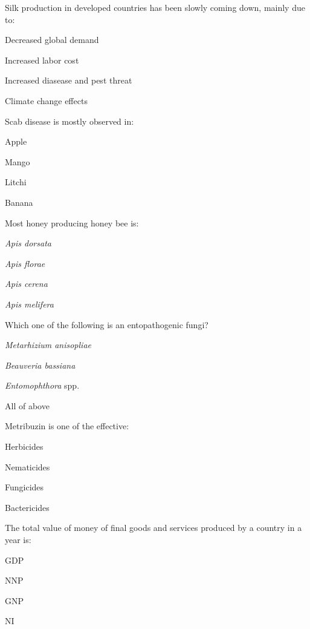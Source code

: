 \begin{questions}
\question Silk production in developed countries has been slowly coming down, mainly due to:
  \begin{items}
  \item Decreased global demand
  \item Increased labor cost
  \item Increased diasease and pest threat
  \item Climate change effects
  \end{items}

\question Scab disease is mostly observed in:
  \begin{items}
  \item Apple
  \item Mango
  \item Litchi
  \item Banana
  \end{items}

\question Most honey producing honey bee is:
  \begin{items}
  \item \textit{Apis dorsata}
  \item \textit{Apis florae}
  \item \textit{Apis cerena}
  \item \textit{Apis melifera}
  \end{items}

\question Which one of the following is an entopathogenic fungi?
  \begin{items}
  \item \textit{Metarhizium anisopliae}
  \item \textit{Beauveria bassiana}
  \item \textit{Entomophthora} spp.
  \item All of above
  \end{items}

\question Metribuzin is one of the effective:
  \begin{items}
  \item Herbicides
  \item Nematicides
  \item Fungicides
  \item Bactericides
  \end{items}

\question The total value of money of final goods and services produced by a country in a year is:
  \begin{items}
  \item GDP
  \item NNP
  \item GNP
  \item NI
  \end{items}


\end{questions}
